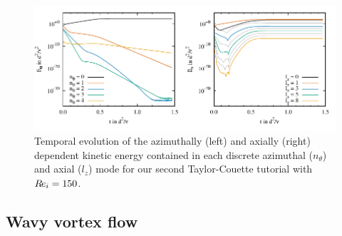 \documentclass[a4paper, 11pt, DIV=11]{scrartcl}
\begin{document}
\begin{figure}[htb]
\centering
\includegraphics[scale=1.00]{figures/tc0041/keThZ.pdf}
\caption{Temporal evolution of the azimuthally (left) and axially (right) 
dependent kinetic energy contained in each discrete azimuthal ($n_{\theta}$)
and axial ($l_{z}$) mode for our second Taylor-Couette tutorial 
with $R\hspace{-0.1em}e_{i}=\num{150}$.}
\label{fig:tc0041keThZ}
\end{figure}

\subsection{Wavy vortex flow}
\label{sec:tc0042}
\end{document}
